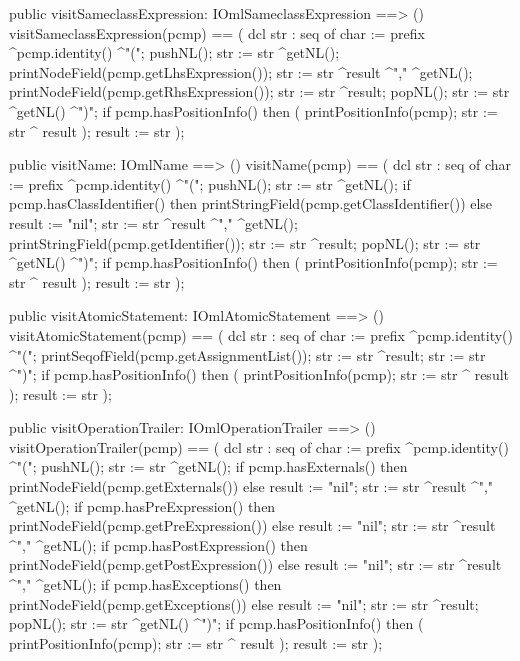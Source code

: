 \begin{vdm_al}
  public visitSameclassExpression: IOmlSameclassExpression ==> ()
  visitSameclassExpression(pcmp) ==
    ( dcl str : seq of char := prefix ^pcmp.identity() ^"(";
      pushNL();
      str := str ^getNL();
      printNodeField(pcmp.getLhsExpression());
      str := str ^result ^"," ^getNL();
      printNodeField(pcmp.getRhsExpression());
      str := str ^result;
      popNL();
      str := str ^getNL() ^")";
      if pcmp.hasPositionInfo()
      then ( printPositionInfo(pcmp);
             str := str ^ result );
      result := str );

  public visitName: IOmlName ==> ()
  visitName(pcmp) ==
    ( dcl str : seq of char := prefix ^pcmp.identity() ^"(";
      pushNL();
      str := str ^getNL();
      if pcmp.hasClassIdentifier()
      then printStringField(pcmp.getClassIdentifier())
      else result := "nil";
      str := str ^result ^"," ^getNL();
      printStringField(pcmp.getIdentifier());
      str := str ^result;
      popNL();
      str := str ^getNL() ^")";
      if pcmp.hasPositionInfo()
      then ( printPositionInfo(pcmp);
             str := str ^ result );
      result := str );

  public visitAtomicStatement: IOmlAtomicStatement ==> ()
  visitAtomicStatement(pcmp) ==
    ( dcl str : seq of char := prefix ^pcmp.identity() ^"(";
      printSeqofField(pcmp.getAssignmentList());
      str := str ^result;
      str := str ^")";
      if pcmp.hasPositionInfo()
      then ( printPositionInfo(pcmp);
             str := str ^ result );
      result := str );

  public visitOperationTrailer: IOmlOperationTrailer ==> ()
  visitOperationTrailer(pcmp) ==
    ( dcl str : seq of char := prefix ^pcmp.identity() ^"(";
      pushNL();
      str := str ^getNL();
      if pcmp.hasExternals()
      then printNodeField(pcmp.getExternals())
      else result := "nil";
      str := str ^result ^"," ^getNL();
      if pcmp.hasPreExpression()
      then printNodeField(pcmp.getPreExpression())
      else result := "nil";
      str := str ^result ^"," ^getNL();
      if pcmp.hasPostExpression()
      then printNodeField(pcmp.getPostExpression())
      else result := "nil";
      str := str ^result ^"," ^getNL();
      if pcmp.hasExceptions()
      then printNodeField(pcmp.getExceptions())
      else result := "nil";
      str := str ^result;
      popNL();
      str := str ^getNL() ^")";
      if pcmp.hasPositionInfo()
      then ( printPositionInfo(pcmp);
             str := str ^ result );
      result := str );


\end{vdm_al}
